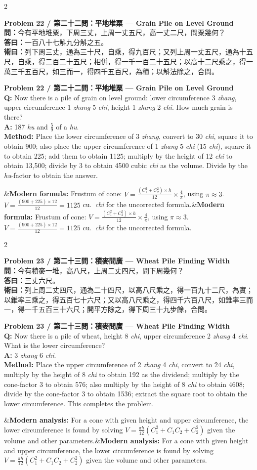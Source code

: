 \documentclass[11pt,a4paper]{article}
\newcommand{\bilingualproblem}[4]{%
  \begin{paracol}{2}
  \begin{leftcolumn}
  \noindent\textbf{\color{problemcolor}#1}\\[0.2cm]
  #2
  \end{leftcolumn}
  \switchcolumn
  \noindent\textbf{\color{problemcolor}#1}\\[0.2cm]
  #3
  \end{paracol}
  \ifx&#4&\else\vspace{0.3cm}\noindent#4\fi
  \vspace{0.5cm}
}
\newcommand{\wen}[1]{\textcolor{problemcolor}{\textbf{問：}}#1}
\newcommand{\da}[1]{\textcolor{answercolor}{\textbf{答曰：}}#1}
\newcommand{\shu}[1]{\textcolor{methodcolor}{\textbf{術曰：}}#1}
\newcommand{\wenen}[1]{\textcolor{problemcolor}{\textbf{Q:}} #1}
\newcommand{\daen}[1]{\textcolor{answercolor}{\textbf{A:}} #1}
\newcommand{\shuen}[1]{\textcolor{methodcolor}{\textbf{Method:}} #1}
\begin{document}
\newpage

\bilingualproblem{Problem 22 / 第二十二問：平地堆粟 --- Grain Pile on Level Ground}{
\wen{今有平地堆粟，下周三丈，上周一丈五尺，高一丈二尺，問粟幾何？}\\[0.2cm]
\da{一百八十七斛九分斛之五。}\\[0.2cm]
\shu{列下周三丈，通為三十尺，自乘，得九百尺；又列上周一丈五尺，通為十五尺，自乘，得二百二十五尺；相併，得一千一百二十五尺；以高十二尺乘之，得一萬三千五百尺，如三而一，得四千五百尺，為積；以斛法除之，合問。}
}{
\wenen{Now there is a pile of grain on level ground: lower circumference 3 \textit{zhang}, upper circumference 1 \textit{zhang} 5 \textit{chi}, height 1 \textit{zhang} 2 \textit{chi}. How much grain is there?}\\[0.2cm]
\daen{187 \textit{hu} and $\frac{5}{9}$ of a \textit{hu}.}\\[0.2cm]
\shuen{Place the lower circumference of 3 \textit{zhang}, convert to 30 \textit{chi}, square it to obtain 900; also place the upper circumference of 1 \textit{zhang} 5 \textit{chi} (15 \textit{chi}), square it to obtain 225; add them to obtain 1125; multiply by the height of 12 \textit{chi} to obtain 13,500; divide by 3 to obtain 4500 cubic \textit{chi} as the volume. Divide by the \textit{hu}-factor to obtain the answer.}
}{\textbf{Modern formula:} Frustum of cone: $V = \frac{(C_1^2 + C_2^2) \times h}{12} \times \frac{4}{\pi}$, using $\pi \approx 3$. $V = \frac{(900+225) \times 12}{12} = 1125$ cu.\ \textit{chi} for the uncorrected formula.}

\bilingualproblem{Problem 23 / 第二十三問：積麥問廣 --- Wheat Pile Finding Width}{
\wen{今有積麥一堆，高八尺，上周二丈四尺，問下周幾何？}\\[0.2cm]
\da{三丈六尺。}\\[0.2cm]
\shu{列上周二丈四尺，通為二十四尺，以高八尺乘之，得一百九十二尺，為實；以錐率三乘之，得五百七十六尺；又以高八尺乘之，得四千六百八尺，如錐率三而一，得一千五百三十六尺；開平方除之，得下周三十九步餘，合問。}
}{
\wenen{Now there is a pile of wheat, height 8 \textit{chi}, upper circumference 2 \textit{zhang} 4 \textit{chi}. What is the lower circumference?}\\[0.2cm]
\daen{3 \textit{zhang} 6 \textit{chi}.}\\[0.2cm]
\shuen{Place the upper circumference of 2 \textit{zhang} 4 \textit{chi}, convert to 24 \textit{chi}, multiply by the height of 8 \textit{chi} to obtain 192 as the dividend; multiply by the cone-factor 3 to obtain 576; also multiply by the height of 8 \textit{chi} to obtain 4608; divide by the cone-factor 3 to obtain 1536; extract the square root to obtain the lower circumference. This completes the problem.}
}{\textbf{Modern analysis:} For a cone with given height and upper circumference, the lower circumference is found by solving $V = \frac{\pi h}{12}(C_1^2 + C_1 C_2 + C_2^2)$ given the volume and other parameters.}
\end{document}
